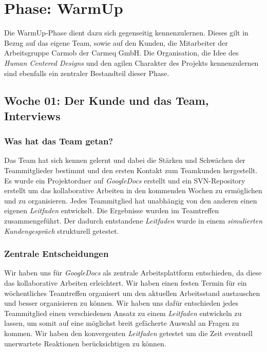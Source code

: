 \documentclass[12pt,a4paper]{article}
\begin{document}

\newpage
\tableofcontents
\newpage



\section{Phase: WarmUp}

Die WarmUp-Phase dient dazu sich gegenseitig kennenzulernen. Dieses gilt in Bezug auf das eigene Team, sowie auf den Kunden, die Mitarbeiter der Arbeitsgruppe Carmob der Carmeq GmbH. Die Organisation, die Idee des \textit{Human Centered Designs} und den agilen Charakter des Projekts kennenzulernen sind ebenfalls ein zentraler Bestandteil dieser Phase.

\subsection{Woche 01: Der Kunde und das Team, Interviews}

\subsubsection{Was hat das Team getan?}

Das Team hat sich kennen gelernt und dabei die St\"arken und Schw\"achen der Teammitglieder bestimmt und den ersten Kontakt zum Teamkunden hergestellt. Es wurde ein Projektordner auf \textit{GoogleDocs} erstellt und ein SVN-Repository erstellt um das kollaborative Arbeiten in den kommenden Wochen zu erm\"oglichen und zu organisieren. Jedes Teammitglied hat unabh\"angig von den anderen einen eigenen \textit{Leitfaden} entwickelt. Die Ergebnisse wurden im Teamtreffen zusammengef\"uhrt. Der dadurch entstandene \textit{Leitfaden} wurde in einem \textit{simulierten Kundengespr\"ach} strukturell getestet.

\subsubsection{Zentrale Entscheidungen}

Wir haben uns f\"ur \textit{GoogleDocs} als zentrale Arbeitsplattform entschieden, da diese das kollaborative Arbeiten erleichtert. Wir haben einen festen Termin f\"ur ein w\"ochentliches Teamtreffen organisert um den aktuellen Arbeitsstand austauschen und besser organisieren zu k\"onnen. Wir haben uns daf\"ur entschieden jedes Teammitglied einen verschiedenen Ansatz zu einem \textit{Leitfaden} entwickeln zu lassen, um somit auf eine m\"oglichst breit gef\"acherte Auswahl an Fragen zu kommen. Wir haben den konvergenten \textit{Leitfaden} getestet um die Zeit eventuell unerwartete Reaktionen ber\"ucksichtigen zu k\"onnen.
\end{document}
